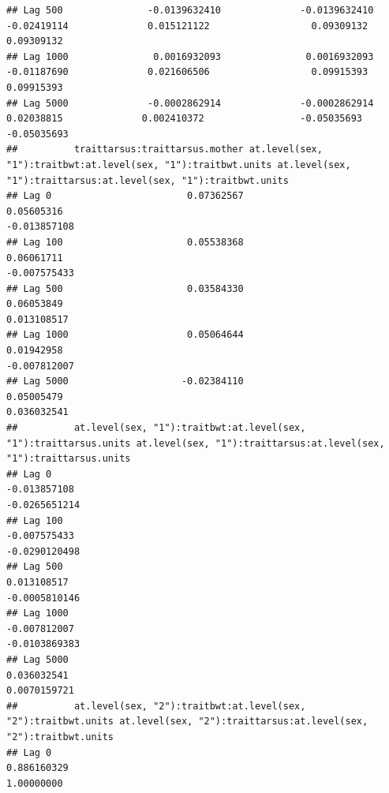 \documentclass[
  12pt,
]{book}
\begin{document}
\begin{verbatim}
## Lag 500               -0.0139632410              -0.0139632410                   -0.02419114              0.015121122                  0.09309132                  0.09309132
## Lag 1000               0.0016932093               0.0016932093                   -0.01187690              0.021606506                  0.09915393                  0.09915393
## Lag 5000              -0.0002862914              -0.0002862914                    0.02038815              0.002410372                 -0.05035693                 -0.05035693
##          traittarsus:traittarsus.mother at.level(sex, "1"):traitbwt:at.level(sex, "1"):traitbwt.units at.level(sex, "1"):traittarsus:at.level(sex, "1"):traitbwt.units
## Lag 0                        0.07362567                                                    0.05605316                                                     -0.013857108
## Lag 100                      0.05538368                                                    0.06061711                                                     -0.007575433
## Lag 500                      0.03584330                                                    0.06053849                                                      0.013108517
## Lag 1000                     0.05064644                                                    0.01942958                                                     -0.007812007
## Lag 5000                    -0.02384110                                                    0.05005479                                                      0.036032541
##          at.level(sex, "1"):traitbwt:at.level(sex, "1"):traittarsus.units at.level(sex, "1"):traittarsus:at.level(sex, "1"):traittarsus.units
## Lag 0                                                        -0.013857108                                                       -0.0265651214
## Lag 100                                                      -0.007575433                                                       -0.0290120498
## Lag 500                                                       0.013108517                                                       -0.0005810146
## Lag 1000                                                     -0.007812007                                                       -0.0103869383
## Lag 5000                                                      0.036032541                                                        0.0070159721
##          at.level(sex, "2"):traitbwt:at.level(sex, "2"):traitbwt.units at.level(sex, "2"):traittarsus:at.level(sex, "2"):traitbwt.units
## Lag 0                                                      0.886160329                                                       1.00000000

\end{verbatim}
\end{document}
